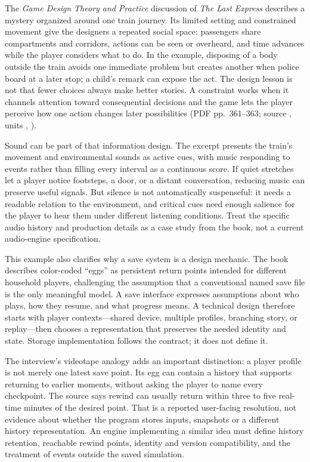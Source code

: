 \hypertarget{06-engine-ii-ch047-constraints-can-carry-story-when-consequences-stay-visible}{}

The \emph{Game Design Theory and Practice} discussion of \emph{The Last Express} describes a mystery organized around one train journey. Its limited setting and constrained movement give the designers a repeated social space: passengers share compartments and corridors, actions can be seen or overheard, and time advances while the player considers what to do. In the example, disposing of a body outside the train avoids one immediate problem but creates another when police board at a later stop; a child's remark can expose the act. The design lesson is not that fewer choices always make better stories. A constraint works when it channels attention toward consequential decisions and the game lets the player perceive how one action changes later possibilities (PDF pp.~361--363; source , units , ).

Sound can be part of that information design. The excerpt presents the train's movement and environmental sounds as active cues, with music responding to events rather than filling every interval as a continuous score. If quiet stretches let a player notice footsteps, a door, or a distant conversation, reducing music can preserve useful signals. But silence is not automatically suspenseful: it needs a readable relation to the environment, and critical cues need enough salience for the player to hear them under different listening conditions. Treat the specific audio history and production details as a case study from the book, not a current audio-engine specification.

This example also clarifies why a save system is a design mechanic. The book describes color-coded ``eggs'' as persistent return points intended for different household players, challenging the assumption that a conventional named save file is the only meaningful model. A save interface expresses assumptions about who plays, how they resume, and what progress means. A technical design therefore starts with player contexts---shared device, multiple profiles, branching story, or replay---then chooses a representation that preserves the needed identity and state. Storage implementation follows the contract; it does not define it.

The interview's videotape analogy adds an important distinction: a player profile is not merely one latest save point. Its egg can contain a history that supports returning to earlier moments, without asking the player to name every checkpoint. The source says rewind can usually return within three to five real-time minutes of the desired point. That is a reported user-facing resolution, not evidence about whether the program stores inputs, snapshots or a different history representation. An engine implementing a similar idea must define history retention, reachable rewind points, identity and version compatibility, and the treatment of events outside the saved simulation.

